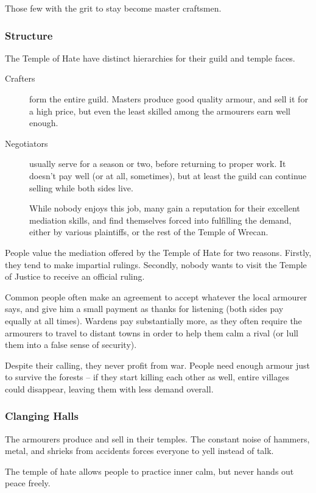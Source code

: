\begin{multicols}{2}
Those few with the grit to stay become master craftsmen.

\subsubsection{Structure}
The Temple of Hate have distinct hierarchies for their guild and temple faces.

\begin{description}
  \item[Crafters]
  form the entire guild.
  Masters produce good quality armour, and sell it for a high price, but even the least skilled among the armourers earn well enough.
  \item[Negotiators]
  usually serve for a season or two, before returning to proper work.
  It doesn't pay well (or at all, sometimes), but at least the guild can continue selling while both sides live.

  While nobody enjoys this job, many gain a reputation for their excellent mediation skills, and find themselves forced into fulfilling the demand, either by various plaintiffs, or the rest of the Temple of Wrecan.
\end{description}

\noindent
People value the mediation offered by the Temple of Hate for two reasons.
Firstly, they tend to make impartial rulings.
Secondly, nobody wants to visit the Temple of Justice to receive an official ruling.

Common people often make an agreement to accept whatever the local armourer says, and give him a small payment as thanks for listening (both sides pay equally at all times).
Wardens pay substantially more, as they often require the armourers to travel to distant towns in order to help them calm a rival (or lull them into a false sense of security).

Despite their calling, they never profit from war.
People need enough armour just to survive the forests -- if they start killing each other as well, entire \glspl{village} could disappear, leaving them with less demand overall.

\subsubsection{Clanging Halls}
The armourers produce and sell in their temples.
The constant noise of hammers, metal, and shrieks from accidents forces everyone to yell instead of talk.

The temple of hate allows people to practice inner calm, but never hands out peace freely.


\end{multicols}
